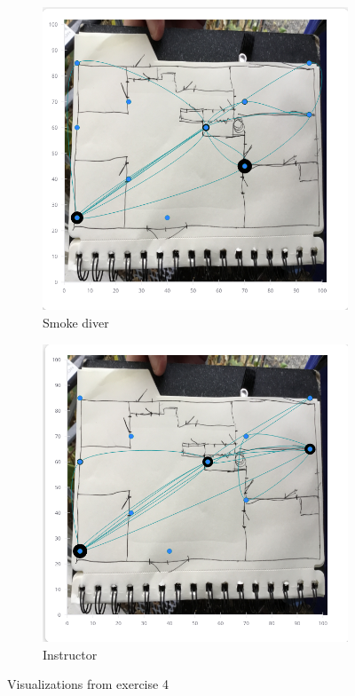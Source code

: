 \documentclass[../Main/thesis.tex]{subfiles}
\begin{document}
\begin{figure}[H]
	\centering
	\begin{subfigure}{0.7\textwidth}
		\includegraphics[width=\textwidth]{../fig/eval_4_1}
		\caption{Smoke diver}
		\label{fig:eval-visualization-4-1-app}
	\end{subfigure}
	\begin{subfigure}{0.7\textwidth}
		\includegraphics[width=\textwidth]{../fig/eval_4_2}
		\caption{Instructor}
		\label{fig:eval-visualization-4-2-app}
	\end{subfigure}
	\caption{Visualizations from exercise 4}
	\label{fig:eval-visualization-4-app}
\end{figure}
\end{document}
